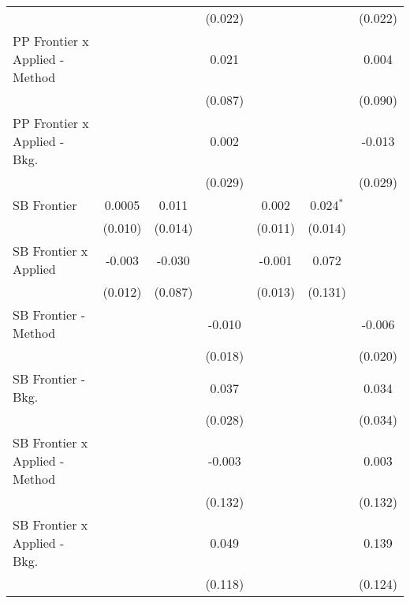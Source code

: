 \begin{tabular}{lcccccc}
                                  &             &               & (0.022)      &             &             & (0.022)\\   
   PP Frontier x Applied - Method &             &               & 0.021        &             &             & 0.004\\   
                                  &             &               & (0.087)      &             &             & (0.090)\\   
   PP Frontier x Applied - Bkg.   &             &               & 0.002        &             &             & -0.013\\   
                                  &             &               & (0.029)      &             &             & (0.029)\\   
   SB Frontier                    & 0.0005      & 0.011         &              & 0.002       & 0.024$^{*}$ &   \\   
                                  & (0.010)     & (0.014)       &              & (0.011)     & (0.014)     &   \\   
   SB Frontier x Applied          & -0.003      & -0.030        &              & -0.001      & 0.072       &   \\   
                                  & (0.012)     & (0.087)       &              & (0.013)     & (0.131)     &   \\   
   SB Frontier - Method           &             &               & -0.010       &             &             & -0.006\\   
                                  &             &               & (0.018)      &             &             & (0.020)\\   
   SB Frontier - Bkg.             &             &               & 0.037        &             &             & 0.034\\   
                                  &             &               & (0.028)      &             &             & (0.034)\\   
   SB Frontier x Applied - Method &             &               & -0.003       &             &             & 0.003\\   
                                  &             &               & (0.132)      &             &             & (0.132)\\   
   SB Frontier x Applied - Bkg.   &             &               & 0.049        &             &             & 0.139\\   
                                  &             &               & (0.118)      &             &             & (0.124)\\   

\end{tabular}
